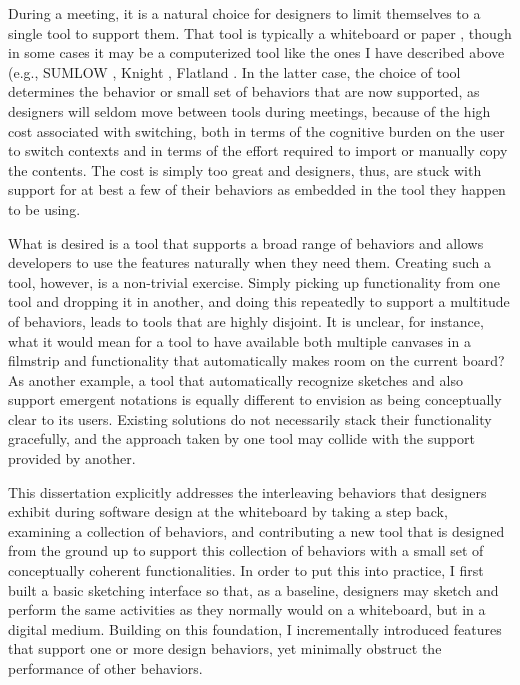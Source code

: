 During a meeting, it is a natural choice for designers to limit themselves to a single tool to support them. That tool is typically a whiteboard or paper \cite{petre2009insights}, though in some cases it may be a computerized tool like the ones I have described above (e.g., SUMLOW \cite{chen2008sumlow}, Knight \cite{damm2000tool}, Flatland \cite{mynatt1999flatland}. In the latter case, the choice of tool determines the behavior or small set of behaviors that are now supported, as designers will seldom move between tools during meetings, because of the high cost associated with switching, both in terms of the cognitive burden on the user to switch contexts and in terms of the effort required to import or manually copy the contents. The cost is simply too great and designers, thus, are stuck with support for at best a few of their behaviors as embedded in the tool they happen to be using.

What is desired is a tool that supports a broad range of behaviors and allows developers to use the features naturally when they need them. Creating such a tool, however, is a non-trivial exercise. Simply picking up functionality from one tool and dropping it in another, and doing this repeatedly to support a multitude of behaviors, leads to tools that are highly disjoint. It is unclear, for instance, what it would mean for a tool to have available both multiple canvases in a filmstrip and functionality that automatically makes room on the current board? As another example, a tool that automatically recognize sketches and also support emergent notations is equally different to envision as being conceptually clear to its users. Existing solutions do not necessarily stack their functionality gracefully, and the approach taken by one tool may collide with the support provided by another.

This dissertation explicitly addresses the interleaving behaviors that designers exhibit during software design at the whiteboard by taking a step back, examining a collection of behaviors, and contributing a new tool that is designed from the ground up to support this collection of behaviors with a small set of conceptually coherent functionalities. In order to put this into practice, I first built a basic sketching interface so that, as a baseline, designers may sketch and perform the same activities as they normally would on a whiteboard, but in a digital medium. Building on this foundation, I incrementally introduced features that support one or more design behaviors, yet minimally obstruct the performance of other behaviors. 

